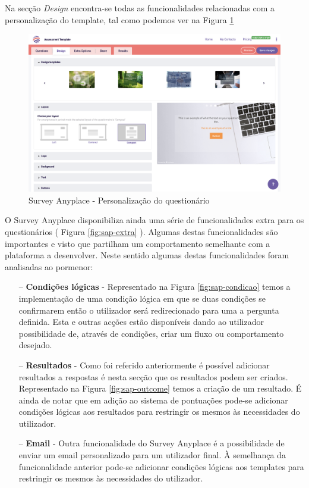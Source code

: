 Na secção \textit{Design} encontra-se todas as funcionalidades relacionadas com a personalização do template, tal como podemos ver na Figura \ref{fig:sap-design}

\begin{figure}[ht!]
	\begin{center}
		\includegraphics[width=1\textwidth]{img/sap/design}
		\caption{Survey Anyplace - Personalização do questionário}
		\label{fig:sap-design}
	\end{center}
\end{figure}

O Survey Anyplace disponibiliza ainda uma série de funcionalidades extra para os questionários ( Figura \ref{fig:sap-extra} ). Algumas destas funcionalidades são importantes e visto que partilham um comportamento semelhante com a plataforma a desenvolver. Neste sentido algumas destas funcionalidades foram analisadas ao pormenor:
\begin{itemize}
	\item[--] \textbf{Condições lógicas} - Representado na Figura \ref{fig:sap-condicao} temos a implementação de uma condição lógica em que se duas condições se confirmarem então o utilizador será redirecionado para uma a pergunta definida. Esta e outras acções estão disponíveis dando ao utilizador possibilidade de, através de condições, criar um fluxo ou comportamento desejado.
	\item[--] \textbf{Resultados} - Como foi referido anteriormente é possível adicionar resultados a respostas é nesta secção que os resultados podem ser criados. Representado na Figura \ref{fig:sap-outcome} temos a criação de um resultado. É ainda de notar que em adição ao sistema de pontuações pode-se adicionar condições lógicas aos resultados para restringir os mesmos às necessidades do utilizador.
	\item[--] \textbf{Email} - Outra funcionalidade do Survey Anyplace é a possibilidade de enviar um email personalizado para um utilizador final. À semelhança da funcionalidade anterior pode-se adicionar condições lógicas aos templates para restringir os mesmos às necessidades do utilizador.
\end{itemize}

